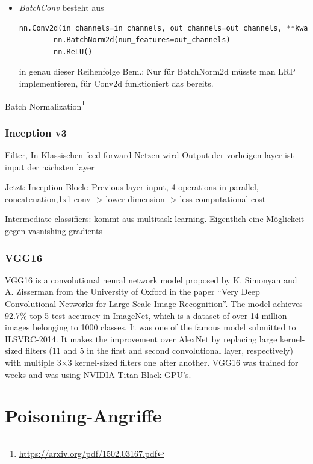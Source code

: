 \documentclass[twoside, 12pt,a4paper]{article}
\numberwithin{equation}{section}
\begin{document}
	\begin{itemize}
		\item \textit{BatchConv} besteht aus 
		\begin{lstlisting}[language=Python, caption=python-interner Aufbau einer BatchConv Schicht]
		nn.Conv2d(in_channels=in_channels, out_channels=out_channels, **kwargs)
		nn.BatchNorm2d(num_features=out_channels)
		nn.ReLU()
		\end{lstlisting}
		in genau dieser Reihenfolge
		Bem.: Nur für BatchNorm2d müsste man LRP implementieren, für Conv2d funktioniert das bereits.
	\end{itemize}

	Batch Normalization\footnote{\url{https://arxiv.org/pdf/1502.03167.pdf}}
	
	
	\subsubsection{Inception v3}
	Filter,
	In Klassischen feed forward Netzen wird Output der vorheigen layer ist input der nächsten layer
	
	Jetzt: Inception Block: Previous layer input, 4 operations in parallel, concatenation,1x1 conv -> lower dimension -> less computational cost
	
	Intermediate classifiers: kommt aus multitask learning. Eigentlich eine Möglickeit gegen vasnishing gradients
	
	\subsubsection{VGG16}
	VGG16 is a convolutional neural network model proposed by K. Simonyan and A. Zisserman from the University of Oxford in the paper “Very Deep Convolutional Networks for Large-Scale Image Recognition”. The model achieves 92.7\% top-5 test accuracy in ImageNet, which is a dataset of over 14 million images belonging to 1000 classes. It was one of the famous model submitted to ILSVRC-2014. It makes the improvement over AlexNet by replacing large kernel-sized filters (11 and 5 in the first and second convolutional layer, respectively) with multiple 3×3 kernel-sized filters one after another. VGG16 was trained for weeks and was using NVIDIA Titan Black GPU’s.\cite{vgg16_neurohive} \cite{vgg16_architecture}
	
	
	
	\section{Poisoning-Angriffe} \label{chapter_poisoningattacks}
\end{document}
